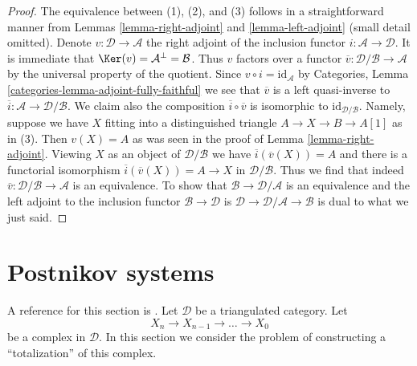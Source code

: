 \begin{proof}
The equivalence between (1), (2), and (3) follows in a straightforward manner
from Lemmas \ref{lemma-right-adjoint} and \ref{lemma-left-adjoint} (small
detail omitted). Denote $v : \mathcal{D} \to \mathcal{A}$ the right
adjoint of the inclusion functor $i : \mathcal{A} \to \mathcal{D}$.
It is immediate that $\Ker(v) = \mathcal{A}^\perp = \mathcal{B}$.
Thus $v$ factors over a functor
$\overline{v} : \mathcal{D}/\mathcal{B} \to \mathcal{A}$
by the universal property of the quotient. Since
$v \circ i = \text{id}_\mathcal{A}$ by
Categories, Lemma \ref{categories-lemma-adjoint-fully-faithful}
we see that $\overline{v}$ is a left quasi-inverse to
$\overline{i} : \mathcal{A} \to \mathcal{D}/\mathcal{B}$.
We claim also the composition $\overline{i} \circ \overline{v}$
is isomorphic to $\text{id}_{\mathcal{D}/\mathcal{B}}$.
Namely, suppose we have $X$ fitting into a distinguished triangle
$A \to X \to B \to A[1]$ as in (3). Then $v(X) = A$ as was seen
in the proof of Lemma \ref{lemma-right-adjoint}.
Viewing $X$ as an object of $\mathcal{D}/\mathcal{B}$
we have $\overline{i}(\overline{v}(X)) = A$ and there
is a functorial isomorphism $\overline{i}(\overline{v}(X)) = A \to X$
in $\mathcal{D}/\mathcal{B}$. Thus we find that indeed
$\overline{v} : \mathcal{D}/\mathcal{B} \to \mathcal{A}$
is an equivalence. To show that
$\mathcal{B} \to \mathcal{D}/\mathcal{A}$ is an equivalence and
the left adjoint to the inclusion functor $\mathcal{B} \to \mathcal{D}$
is $\mathcal{D} \to \mathcal{D}/\mathcal{A} \to \mathcal{B}$
is dual to what we just said.
\end{proof}




\section{Postnikov systems}
\label{section-postnikov}

\noindent
A reference for this section is \cite{Orlov-K3}. Let $\mathcal{D}$
be a triangulated category. Let
$$
X_n \to X_{n - 1} \to \ldots \to X_0
$$
be a complex in $\mathcal{D}$. In this section we consider the problem
of constructing a ``totalization'' of this complex.

